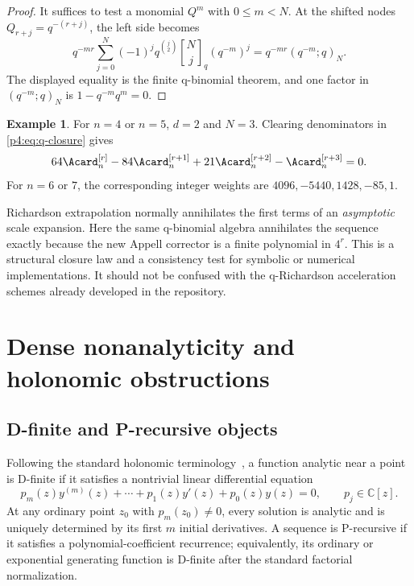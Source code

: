 \documentclass[11pt]{article}
\numberwithin{equation}{section}
\theoremstyle{definition}
\newtheorem{example}[theorem]{Example}
\theoremstyle{remark}
\newcommand{\C}{\mathbb C}
\newcommand{\qbinom}[3]{\genfrac{[}{]}{0pt}{}{#1}{#2}_{#3}}
\begin{document}
\begin{proof}
It suffices to test a monomial $Q^m$ with $0\le m<N$.  At the shifted nodes $Q_{r+j}=q^{-(r+j)}$, the left side becomes
\[
 q^{-mr}\sum_{j=0}^{N}(-1)^jq^{\binom j2}
 \qbinom{N}{j}{q}(q^{-m})^j
 =q^{-mr}(q^{-m};q)_N.
\]
The displayed equality is the finite q-binomial theorem, and one factor in $(q^{-m};q)_N$ is $1-q^{-m}q^m=0$.
\end{proof}

\begin{example}
For $n=4$ or $n=5$, $d=2$ and $N=3$.  Clearing denominators in \eqref{p4:eq:q-closure} gives
\begin{equation}
 64\Acard_n^{[r]}-84\Acard_n^{[r+1]}
 +21\Acard_n^{[r+2]}-\Acard_n^{[r+3]}=0.
 \label{p4:eq:q-closure-example}
\end{equation}
For $n=6$ or $7$, the corresponding integer weights are
$4096,-5440,1428,-85,1$.
\end{example}

\begin{corpusdeductionbox}[title={Exact closure, not asymptotic acceleration}]
Richardson extrapolation normally annihilates the first terms of an \emph{asymptotic} scale expansion.  Here the same q-binomial algebra annihilates the sequence exactly because the new Appell corrector is a finite polynomial in $4^r$.  This is a structural closure law and a consistency test for symbolic or numerical implementations.  It should not be confused with the q-Richardson acceleration schemes already developed in the repository.
\end{corpusdeductionbox}

\section{Dense nonanalyticity and holonomic obstructions}
\label{p4:sec:holonomic}

\subsection{D-finite and P-recursive objects}
Following the standard holonomic terminology~\cite{p4:stanley}, a function analytic near a point is D-finite if it satisfies a nontrivial linear differential equation
\begin{equation}
 p_m(z)y^{(m)}(z)+\cdots+p_1(z)y'(z)+p_0(z)y(z)=0,
 \qquad p_j\in\C[z].
 \label{p4:eq:Dfinite}
\end{equation}
At any ordinary point $z_0$ with $p_m(z_0)\ne0$, every solution is analytic and is uniquely determined by its first $m$ initial derivatives.  A sequence is P-recursive if it satisfies a polynomial-coefficient recurrence; equivalently, its ordinary or exponential generating function is D-finite after the standard factorial normalization.
\end{document}
